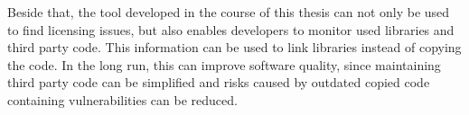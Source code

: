 Beside that, the tool developed in the course of this thesis can not only be used to find licensing issues, but also enables developers to monitor used libraries and third party code.
This information can be used to link libraries instead of copying the code.
In the long run, this can improve software quality, since maintaining third party code can be simplified and risks caused by outdated copied code containing vulnerabilities can be reduced.
